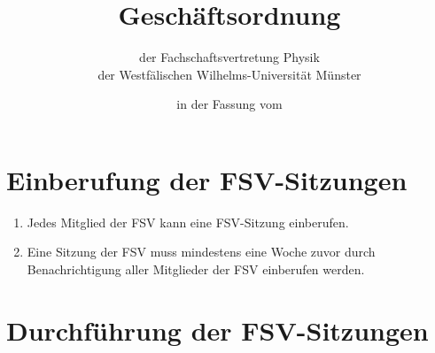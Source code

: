 \documentclass[
	a4paper,
	12pt,
	oneside,
	parskip=half-,
	pagesize,
	headsepline,
	german,
	ngerman
]{scrartcl}
\title{Geschäftsordnung}
\subtitle{der Fachschaftsvertretung Physik\\
der Westfälischen Wilhelms-Universität Münster}
\date{in der Fassung vom \formatdate{06}{01}{2016}}
\author{}
\begin{document}
\maketitle

\section{Einberufung der FSV-Sitzungen}
\begin{enumerate}
	\item Jedes Mitglied der FSV kann eine FSV-Sitzung einberufen.
	\item Eine Sitzung der FSV muss mindestens eine Woche zuvor durch Benachrichtigung aller Mitglieder der FSV einberufen werden.
\end{enumerate}

\section{Durchführung der FSV-Sitzungen}
\end{document}
